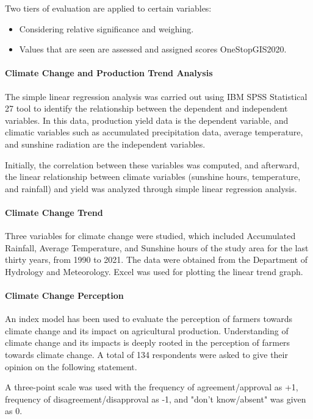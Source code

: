 Two tiers of evaluation are applied to certain variables:
\begin{itemize}
    \item Considering relative significance and weighing.
    \item Values that are seen are assessed and assigned scores OneStopGIS2020.
\end{itemize}

\paragraph{Climate Change and Production Trend Analysis}

The simple linear regression analysis was carried out using IBM SPSS Statistical 27 tool to identify the relationship between the dependent and independent variables. In this data, production yield data is the dependent variable, and climatic variables such as accumulated precipitation data, average temperature, and sunshine radiation are the independent variables.

Initially, the correlation between these variables was computed, and afterward, the linear relationship between climate variables (sunshine hours, temperature, and rainfall) and yield was analyzed through simple linear regression analysis.

\paragraph{Climate Change Trend}

Three variables for climate change were studied, which included Accumulated Rainfall, Average Temperature, and Sunshine hours of the study area for the last thirty years, from 1990 to 2021. The data were obtained from the Department of Hydrology and Meteorology. Excel was used for plotting the linear trend graph.

\paragraph{Climate Change Perception}

An index model has been used to evaluate the perception of farmers towards climate change and its impact on agricultural production. Understanding of climate change and its impacts is deeply rooted in the perception of farmers towards climate change. A total of 134 respondents were asked to give their opinion on the following statement.

A three-point scale was used with the frequency of agreement/approval as +1, frequency of disagreement/disapproval as -1, and "don’t know/absent" was given as 0.

